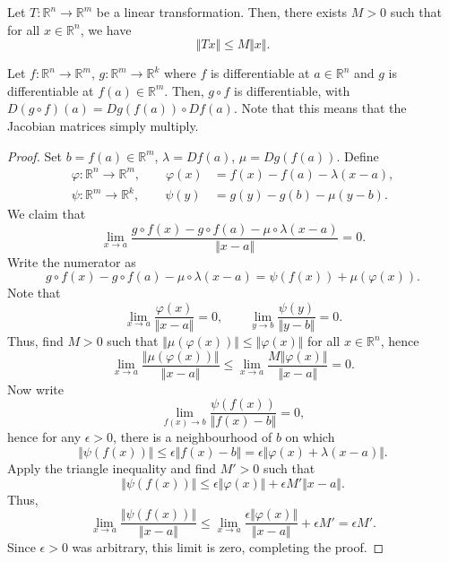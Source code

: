 \documentclass[11pt]{article}
\newcommand{\R}{\mathbb{R}}
\newcommand{\norm}[1]{\Vert #1 \Vert}
\theoremstyle{definition}
\theoremstyle{remark}
\numberwithin{equation}{section}
\begin{document}
    \begin{exercise}
        Let $T\colon \R^n \to \R^m$ be a linear transformation. Then, there exists $M
        > 0$ such that for all $x \in \R^n$, we have \[
            \norm{Tx} \leq M\norm{x}.
        \] 
    \end{exercise}
    \begin{theorem}
        Let $f\colon \R^n \to \R^m$, $g\colon \R^m \to \R^k$ where $f$ is
        differentiable at $a \in \R^n$ and $g$ is differentiable at $f(a) \in \R^m$.
        Then, $g\circ f$ is differentiable, with $D(g\circ f)(a) = Dg(f(a)) \circ
        Df(a)$. Note that this means that the Jacobian matrices simply multiply.
    \end{theorem}
    \begin{proof}
        Set $b = f(a) \in \R^m$, $\lambda = Df(a)$, $\mu = Dg(f(a))$. Define 
        \begin{align*}
            \varphi\colon \R^n \to \R^m,\qquad \varphi(x) &= f(x) - f(a) - \lambda(x
            - a), \\
            \psi\colon \R^m \to \R^k,\qquad \psi(y) &= g(y) - g(b) - \mu(y - b).
        \end{align*}
        We claim that \[
            \lim_{x \to a} \frac{g\circ f(x) - g\circ f(a) - \mu\circ \lambda(x
            - a)}{\norm{x - a}} = 0.
        \] Write the numerator as \[
            g\circ f(x) - g\circ f(a) - \mu\circ \lambda(x - a) = \psi(f(x)) +
            \mu(\varphi(x)).
        \] Note that \[
            \lim_{x \to a} \frac{\varphi(x)}{\norm{x - a}} = 0, \qquad 
            \lim_{y \to b} \frac{\psi(y)}{\norm{y - b}} = 0.
        \] Thus, find $M > 0$ such that $\norm{\mu(\varphi(x))} \leq
        \norm{\varphi(x)}$ for all $x \in \R^n$, hence \[
            \lim_{x \to a} \frac{\norm{\mu(\varphi(x))}}{\norm{x - a}} \leq \lim_{x
            \to a} \frac{M\norm{\varphi(x)}}{\norm{x - a}} = 0.
        \] Now write \[
            \lim_{f(x) \to b} \frac{\psi(f(x))}{\norm{f(x) - b}} = 0, 
        \] hence for any $\epsilon > 0$, there is a neighbourhood of $b$ on which \[
            \norm{\psi(f(x))} \leq \epsilon \norm{f(x) - b} = \epsilon
            \norm{\varphi(x) + \lambda(x - a)}.
        \] Apply the triangle inequality and find $M' > 0$ such that \[
            \norm{\psi(f(x))} \leq
            \epsilon\norm{\varphi(x)} + \epsilon M'\norm{x - a}.
        \] Thus, \[
            \lim_{x \to a} \frac{\norm{\psi(f(x))}}{\norm{x - a}} \leq
            \lim_{x \to a} \frac{\epsilon\norm{\varphi(x)}}{\norm{x - a}} + \epsilon
            M' = \epsilon M'.
        \] Since $\epsilon > 0$ was arbitrary, this limit is zero, completing the proof.
    \end{proof} 
\end{document}
